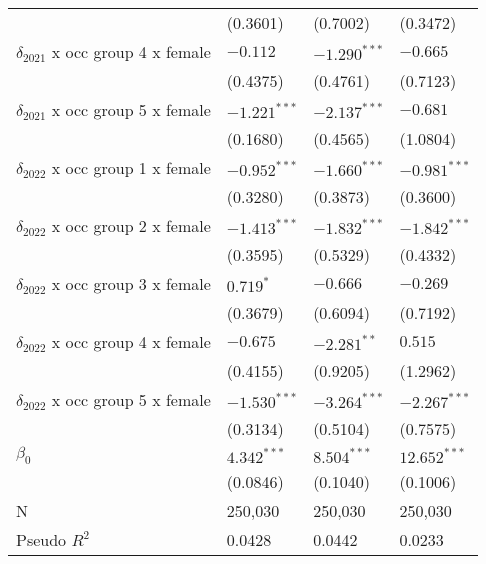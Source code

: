 \begin{tabular}{llll}
                                       &           (0.3601) &           (0.7002) &           (0.3472) \\
$\delta_{2021}$ x occ group 4 x female &           $-0.112$ &     $-1.290^{***}$ &           $-0.665$ \\
                                       &           (0.4375) &           (0.4761) &           (0.7123) \\
$\delta_{2021}$ x occ group 5 x female &     $-1.221^{***}$ &     $-2.137^{***}$ &           $-0.681$ \\
                                       &           (0.1680) &           (0.4565) &           (1.0804) \\
$\delta_{2022}$ x occ group 1 x female &     $-0.952^{***}$ &     $-1.660^{***}$ &     $-0.981^{***}$ \\
                                       &           (0.3280) &           (0.3873) &           (0.3600) \\
$\delta_{2022}$ x occ group 2 x female &     $-1.413^{***}$ &     $-1.832^{***}$ &     $-1.842^{***}$ \\
                                       &           (0.3595) &           (0.5329) &           (0.4332) \\
$\delta_{2022}$ x occ group 3 x female &          $0.719^*$ &           $-0.666$ &           $-0.269$ \\
                                       &           (0.3679) &           (0.6094) &           (0.7192) \\
$\delta_{2022}$ x occ group 4 x female &           $-0.675$ &      $-2.281^{**}$ &            $0.515$ \\
                                       &           (0.4155) &           (0.9205) &           (1.2962) \\
$\delta_{2022}$ x occ group 5 x female &     $-1.530^{***}$ &     $-3.264^{***}$ &     $-2.267^{***}$ \\
                                       &           (0.3134) &           (0.5104) &           (0.7575) \\
$\beta_0$                              &      $4.342^{***}$ &      $8.504^{***}$ &     $12.652^{***}$ \\
                                       &           (0.0846) &           (0.1040) &           (0.1006) \\
N                                      &            250,030 &            250,030 &            250,030 \\
Pseudo $R^2$                           &             0.0428 &             0.0442 &             0.0233 \\
\bottomrule
\end{tabular}
